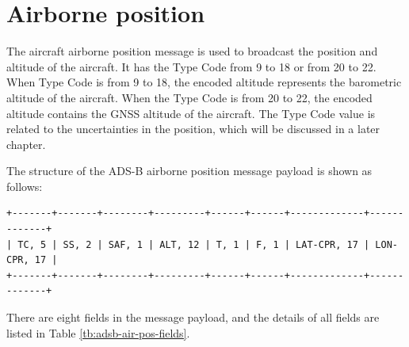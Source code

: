 \chapter{Airborne position} \label{chap:airborn-position}

The aircraft airborne position message is used to broadcast the position and altitude of the aircraft. It has the Type Code from 9 to 18 or from 20 to 22. When Type Code is from 9 to 18, the encoded altitude represents the barometric altitude of the aircraft. When the Type Code is from 20 to 22, the encoded altitude contains the GNSS altitude of the aircraft. The Type Code value is related to the uncertainties in the position, which will be discussed in a later chapter.

The structure of the ADS-B airborne position message payload is shown as follows:

\begin{verbatim}
+-------+-------+--------+---------+------+------+-------------+-------------+
| TC, 5 | SS, 2 | SAF, 1 | ALT, 12 | T, 1 | F, 1 | LAT-CPR, 17 | LON-CPR, 17 |
+-------+-------+--------+---------+------+------+-------------+-------------+
\end{verbatim}

There are eight fields in the message payload, and the details of all fields are listed in Table \ref{tb:adsb-air-pos-fields}.

